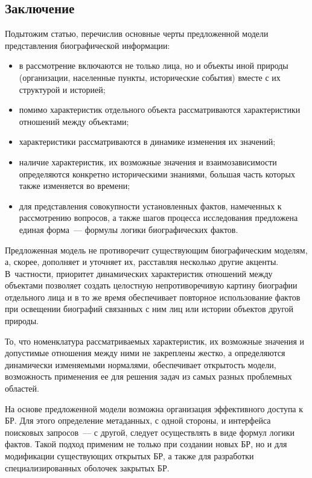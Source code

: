 \begin{multicols}{2}
\section{Заключение}
  
  Подытожим статью, перечислив основные черты предложенной модели 
представления биографической информации:
  \begin{itemize}
\item в рассмотрение включаются не только лица, но и объекты иной природы 
(организации, населенные пункты, исторические события) вместе с их 
структурой и историей;
\item помимо характеристик отдельного объекта рассматриваются 
характеристики отношений между объектами;
\item характеристики рассматриваются в динамике изменения их значений;
\item наличие характеристик, их возможные значения и взаимозависимости 
определяются конкретно историческими знаниями, большая часть которых 
также изменяется во времени;
\item для представления совокупности установленных фактов, намеченных к 
рассмотрению вопросов, а также шагов процесса исследования предложена 
единая форма~--- формулы логики биографических фактов. 
\end{itemize}
  
  Предложенная модель не противоречит существующим биографическим 
моделям, а, скорее, дополняет и уточняет их, расставляя несколько другие 
акценты. В~частности, приоритет динамических характеристик отношений 
между объектами позволяет создать целостную непротиворечивую картину 
биографии отдельного лица и в то же время обеспечивает повторное 
использование фактов при освещении биографий связанных с ним лиц или 
истории объектов другой природы. 
  
  То, что номенклатура рассматриваемых характеристик, их возможные 
значения и допустимые отношения между ними не закреплены жестко, а 
определяются динамически изменяемыми нормалями, обеспечивает открытость 
модели, возможность применения ее для решения задач из самых разных 
проблемных областей.
  
  На основе предложенной модели возможна организация эффективного 
доступа к БР. Для этого определение метаданных, с одной стороны, и 
интерфейса поисковых запросов~--- с другой, следует осуществлять в виде 
формул логики фактов. Такой подход применим не только при создании новых 
БР, но и для модификации существующих открытых БР, а также для разработки 
специализированных оболочек закрытых БР. 
  

\end{multicols}
